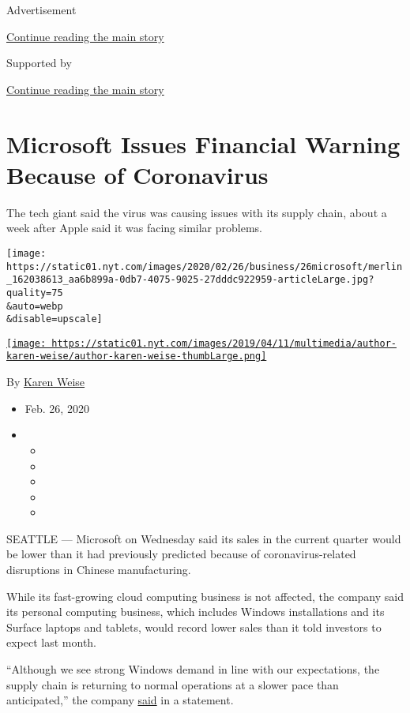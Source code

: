 Advertisement

\protect\hyperlink{after-top}{Continue reading the main story}

Supported by

\protect\hyperlink{after-sponsor}{Continue reading the main story}

\hypertarget{microsoft-issues-financial-warning-because-of-coronavirus}{%
\section{Microsoft Issues Financial Warning Because of
Coronavirus}\label{microsoft-issues-financial-warning-because-of-coronavirus}}

The tech giant said the virus was causing issues with its supply chain,
about a week after Apple said it was facing similar problems.

\texttt{[image: https://static01.nyt.com/images/2020/02/26/business/26microsoft/merlin\_162038613\_aa6b899a-0db7-4075-9025-27dddc922959-articleLarge.jpg?quality=75\\\&auto=webp\\\&disable=upscale]}

\href{https://www.nytimes.com/by/karen-weise}{\texttt{[image: https://static01.nyt.com/images/2019/04/11/multimedia/author-karen-weise/author-karen-weise-thumbLarge.png]}}

By \href{https://www.nytimes.com/by/karen-weise}{Karen Weise}

\begin{itemize}
\item
  Feb. 26, 2020
\item
  \begin{itemize}
  \item
  \item
  \item
  \item
  \item
  \end{itemize}
\end{itemize}

SEATTLE --- Microsoft on Wednesday said its sales in the current quarter
would be lower than it had previously predicted because of
coronavirus-related disruptions in Chinese manufacturing.

While its fast-growing cloud computing business is not affected, the
company said its personal computing business, which includes Windows
installations and its Surface laptops and tablets, would record lower
sales than it told investors to expect last month.

``Although we see strong Windows demand in line with our expectations,
the supply chain is returning to normal operations at a slower pace than
anticipated,'' the company
\href{https://news.microsoft.com/2020/02/26/microsoft-update-on-q3-fy20-guidance/}{said}
in a statement.

